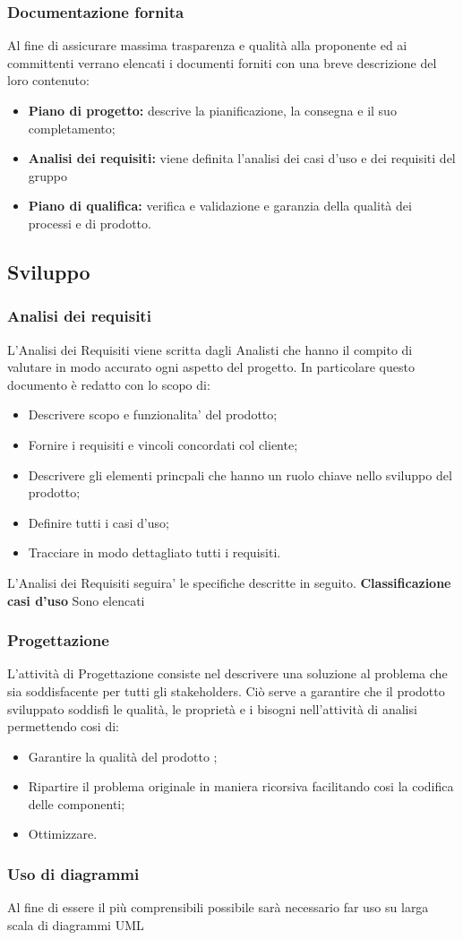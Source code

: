 \documentclass{article}
\begin{document}
    \subsubsection{Documentazione fornita}
    Al fine di assicurare massima trasparenza e qualità alla proponente ed ai committenti verrano elencati i documenti forniti con una breve descrizione del loro contenuto:
    \begin{itemize}
        \item \textbf{Piano di progetto:} descrive la pianificazione, la consegna e il suo completamento;
        \item \textbf{Analisi dei requisiti:} viene definita l'analisi dei casi d'uso e dei requisiti del gruppo
        \item \textbf{Piano di qualifica:} verifica e validazione e garanzia della qualità dei processi e di prodotto.
    \end{itemize}
    \subsection{Sviluppo}
    \subsubsection{Analisi dei requisiti}
    L'Analisi dei Requisiti viene scritta dagli Analisti che hanno il compito di valutare in modo accurato ogni aspetto del progetto. In particolare questo documento è redatto con lo scopo di:
    \begin{itemize}
        \item Descrivere scopo e funzionalita' del prodotto;
        \item Fornire i requisiti e vincoli concordati col cliente;
        \item Descrivere gli elementi princpali che hanno un ruolo chiave nello sviluppo del prodotto;
        \item Definire tutti i casi d'uso;
        \item Tracciare in modo dettagliato tutti i requisiti.
    \end{itemize}
    L'Analisi dei Requisiti seguira' le specifiche descritte in seguito.\newline
    \textbf{Classificazione casi d'uso} Sono elencati
    \subsubsection{Progettazione}
    L'attività di Progettazione consiste nel descrivere una soluzione al problema che sia soddisfacente per tutti gli stakeholders\pedice. Ciò serve a garantire che il prodotto sviluppato soddisfi le qualità, le proprietà e i bisogni nell'attività di analisi permettendo cosi di:
    \begin{itemize}
        \item Garantire la qualità del prodotto ;
        \item Ripartire il problema originale in maniera ricorsiva facilitando cosi la codifica delle componenti;
        \item Ottimizzare.
    \end{itemize}	
    \subsubsection{Uso di diagrammi}
    Al fine di essere il più comprensibili possibile sarà necessario far uso su larga scala di diagrammi UML
\newpage

\newpage

\end{document}
